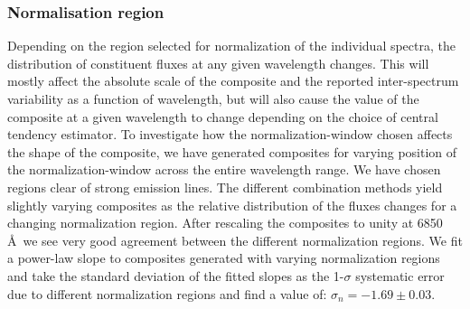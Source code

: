 \documentclass{aa}    %
\newcommand{\figref}[1]{\ref{fig:#1}}
\newcommand{\Fig}[1]{\figurename~\figref{#1}}
\newcommand{\fig}[1]{\Fig{#1}}
\newcommand{\figlabel}[1]{\label{fig:#1}}
\newcommand{\sectlabel}[1]{\label{sect:#1}}
\newcommand{\todo}[3]{{\color{#2}\emph{#1}: #3}}
\newcommand{\jstodo}[1]{\todo{TODO }{green}{#1}}
\begin{document}
\subsubsection{Normalisation region}  \sectlabel{Normalisation region}
Depending on the region selected for normalization of the individual
spectra, the distribution of constituent fluxes at any given
wavelength changes. This will mostly affect the absolute scale of the
composite and the reported inter-spectrum variability as a function of
wavelength, but will also cause the value of the composite at a given
wavelength to change depending on the choice of central tendency
estimator. To investigate how the normalization-window chosen affects
the shape of the composite, we have generated composites for varying
position of the normalization-window across the entire wavelength
range. We have chosen regions clear of strong emission lines. The
different combination methods yield slightly varying composites as the
relative distribution of the fluxes changes for a changing
normalization region. After rescaling the composites to unity at 6850
\AA~we see very good agreement between the different normalization
regions.
 We fit a power-law slope to composites generated with varying normalization
regions and take the standard deviation of the fitted slopes as the 1-$\sigma$
systematic error due to different normalization regions and find a value of:
$\sigma_{n} = -1.69 \pm 0.03$.
\end{document}
